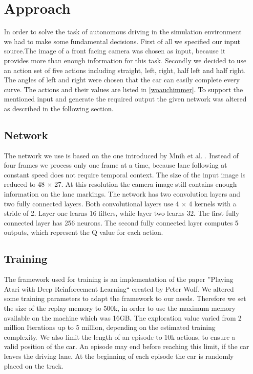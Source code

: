 
\section{Approach}\label{sec:approach}

In order to solve the task of autonomous driving in the simulation environment we had to make some fundamental decisions. First of all we specified our input source.The image of a front facing camera was chosen as input, because it provides more than enough information for this task. Secondly we decided to use an action set of five actions including straight, left, right, half left and half right. The angles of left and right were chosen that the car can easily complete every curve. The actions and their values are listed in \ref{woauchimmer}. To support the mentioned input and generate the required output the given network was altered as described in the following section.

\subsection{Network}
The network we use is based on the one introduced by Mnih et al. \cite{Mnih13}. Instead of four frames we process only one frame at a time, because lane following at constant speed does not require temporal context. The size of the input image is reduced to 48 $\times$ 27. At this resolution the camera image still contains enough information on the lane markings. The network has two convolution layers and two fully connected layers. Both convolutional layers use 4 $\times$ 4 kernels with a stride of 2. Layer one learns 16 filters, while layer two learns 32. The first fully connected layer has 256 neurons. The second fully connected layer computes 5 outputs, which represent the Q value for each action.


\subsection{Training}
The framework used for training is an implementation of the paper ''Playing Atari with Deep Reinforcement Learning``  created by Peter Wolf. We altered some training parameters to adapt the framework to our needs. Therefore we set the size of the replay memory to 500k, in order to use the maximum memory available on the machine which was 16GB. The exploration value varied from 2 million Iterations up to 5 million, depending on the estimated training complexity. We also limit the length of an episode to 10k actions, to ensure a valid position of the car. An episode may end before reaching this limit, if the car leaves the driving lane. At the beginning of each episode the car is randomly placed on the track.

